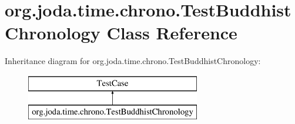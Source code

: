\hypertarget{classorg_1_1joda_1_1time_1_1chrono_1_1_test_buddhist_chronology}{\section{org.\-joda.\-time.\-chrono.\-Test\-Buddhist\-Chronology Class Reference}
\label{classorg_1_1joda_1_1time_1_1chrono_1_1_test_buddhist_chronology}
}
Inheritance diagram for org.\-joda.\-time.\-chrono.\-Test\-Buddhist\-Chronology\-:\begin{figure}[H]
\begin{center}
\leavevmode
\includegraphics[height=2.000000cm]{classorg_1_1joda_1_1time_1_1chrono_1_1_test_buddhist_chronology}
\end{center}
\end{figure}
